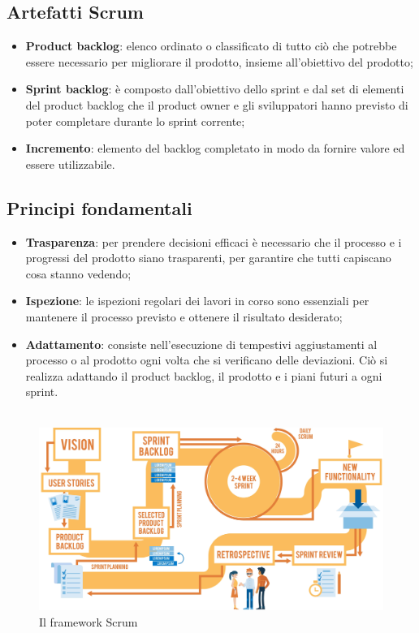 \subsection{Artefatti Scrum}
\begin{itemize}
    \item \textbf{Product backlog}: elenco ordinato o classificato di tutto ciò che potrebbe
          essere necessario per migliorare il prodotto, insieme all'obiettivo del prodotto;
    \item \textbf{Sprint backlog}: è composto dall'obiettivo dello sprint e dal set di
          elementi del product backlog che il product owner e gli sviluppatori hanno previsto
          di poter completare durante lo sprint corrente;
    \item \textbf{Incremento}: elemento del backlog completato in modo da fornire valore
          ed essere utilizzabile.
\end{itemize}
\subsection{Principi fondamentali}
\begin{itemize}
    \item \textbf{Trasparenza}: per prendere decisioni efficaci è necessario
          che il processo e i progressi del prodotto siano trasparenti,
          per garantire che tutti capiscano cosa stanno vedendo;
    \item \textbf{Ispezione}: le ispezioni regolari dei lavori in corso sono
          essenziali per mantenere il processo previsto e ottenere il risultato desiderato;
    \item \textbf{Adattamento}: consiste nell'esecuzione di tempestivi aggiustamenti
          al processo o al prodotto ogni volta che si verificano delle deviazioni. Ciò si
          realizza adattando il product backlog, il prodotto e i piani futuri a ogni sprint.\\\\
\end{itemize}

\begin{figure}[h!]
    \centering
    \includegraphics[scale = 0.08]{template/images/scrum.jpg}
    \caption{Il framework Scrum}
    \label{fig:2.1} %
\end{figure}